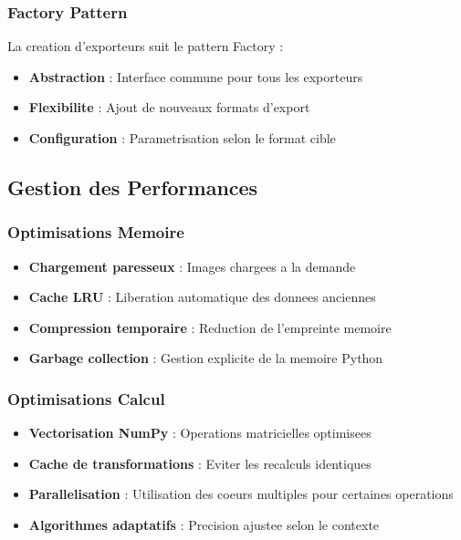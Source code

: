 \documentclass[12pt,a4paper]{article}
\begin{document}
\subsubsection{Factory Pattern}

La creation d'exporteurs suit le pattern Factory :

\begin{itemize}
\item \textbf{Abstraction} : Interface commune pour tous les exporteurs
\item \textbf{Flexibilite} : Ajout de nouveaux formats d'export
\item \textbf{Configuration} : Parametrisation selon le format cible
\end{itemize}

\subsection{Gestion des Performances}

\subsubsection{Optimisations Memoire}

\begin{itemize}
\item \textbf{Chargement paresseux} : Images chargees a la demande
\item \textbf{Cache LRU} : Liberation automatique des donnees anciennes
\item \textbf{Compression temporaire} : Reduction de l'empreinte memoire
\item \textbf{Garbage collection} : Gestion explicite de la memoire Python
\end{itemize}

\subsubsection{Optimisations Calcul}

\begin{itemize}
\item \textbf{Vectorisation NumPy} : Operations matricielles optimisees
\item \textbf{Cache de transformations} : Eviter les recalculs identiques
\item \textbf{Parallelisation} : Utilisation des coeurs multiples pour certaines operations
\item \textbf{Algorithmes adaptatifs} : Precision ajustee selon le contexte
\end{itemize}
\end{document}
